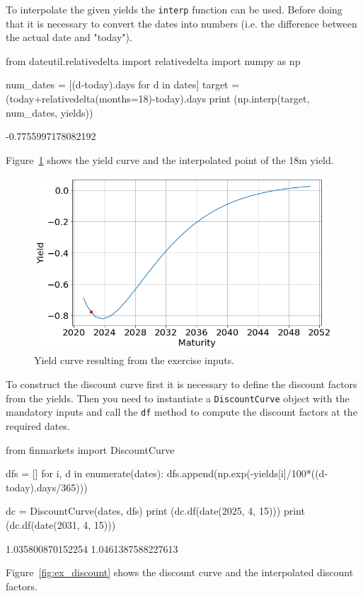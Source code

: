 \cprotEnv\begin{solution}
To interpolate the given yields the \texttt{interp} function can be used. Before doing that it is necessary to convert the dates into numbers (i.e. the difference between the actual date and "today").
\begin{ipython}
from dateutil.relativedelta import relativedelta
import numpy as np

num_dates = [(d-today).days for d in dates]
target = (today+relativedelta(months=18)-today).days
print (np.interp(target, num_dates, yields))
\end{ipython}
\begin{ioutput}
-0.7755997178082192
\end{ioutput}

Figure~\ref{fig:ex_yield} shows the yield curve and the interpolated point of the 18m yield.

\begin{figure}[htpb]
\centering
\includegraphics[width=0.7\linewidth]{figures/ex_yield}
\caption{Yield curve resulting from the exercise inputs.}
\label{fig:ex_yield}
\end{figure}

To construct the discount curve first it is necessary to define the discount factors from the yields. Then you need to instantiate a \texttt{DiscountCurve} object with the mandatory inputs and call the \texttt{df} method to compute the discount factors at the required dates.
\begin{ipython}
from finmarkets import DiscountCurve

dfs = []
for i, d in enumerate(dates):
    dfs.append(np.exp(-yields[i]/100*((d-today).days/365)))
    
dc = DiscountCurve(dates, dfs)
print (dc.df(date(2025, 4, 15)))
print (dc.df(date(2031, 4, 15)))
\end{ipython}
\begin{ioutput}
1.035800870152254
1.0461387588227613
\end{ioutput}
\noindent
Figure~\ref{fig:ex_discount} shows the discount curve and the interpolated discount factors.


\end{solution}
